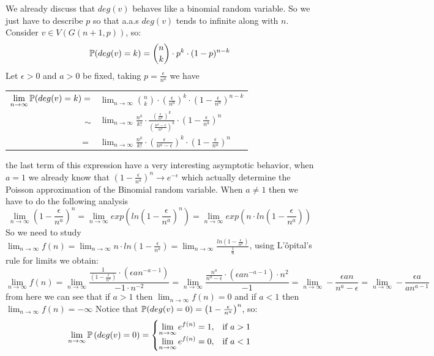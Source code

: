 We already discuss that $deg(v)$ behaves like a binomial random variable. So we just have to describe $p$ so that a.a.s $deg(v)$ tends to infinite along with $n$. Consider $v\in V(G(n+1,p))$, so:
$$ \P(deg(v)=k) = \binom{n}{k} \cdot p^{k} \cdot (1-p)^{n-k}$$
Let $\epsilon>0$ and $a>0$ be fixed, taking $p=\frac{\epsilon}{n^{a}}$ we have
\begin{center}
\begin{tabular}{ r l }
 $\displaystyle\lim_{n\to \infty } \P(deg(v)=k) =$ & $\displaystyle\lim_{n\to \infty} \binom{n}{k} \cdot \left( \frac{\epsilon}{n^a} \right)^k \cdot \left( 1-\frac{\epsilon}{n^a}\right)^{n-k}$ \\
 $\sim$ &  $\displaystyle\lim_{n\to \infty} \frac{n^k}{k!}\cdot  \frac{\left(\frac{\epsilon}{n^a}\right)^k} {\left(\frac{n^a - \epsilon}{n^a}\right)^k} \cdot \left(1-\frac{\epsilon}{n^a}\right)^{n} $\\
$=$ &  $\displaystyle\lim_{n\to \infty} \frac{n^k}{k!}\cdot \left(\frac{\epsilon} {n^a - \epsilon}\right)^k \cdot \left(1-\frac{\epsilon}{n^a}\right)^{n} $\\
\end{tabular}
\end{center}
the last term of this expression have a very interesting asymptotic behavior, when $a=1$ we already know that $\left(1-\frac{\epsilon}{n^a}\right)^{n} \to e^{-\epsilon}$ which actually determine the Poisson approximation of the Binomial random variable. When $a\neq 1$ then we have to do the following analysis
$$\displaystyle\lim_{n\to \infty } \left( 1 - \frac{\epsilon}{n^a}\right)^n = \displaystyle\lim_{n\to \infty} exp\left( ln \left( 1 - \frac{\epsilon}{n^a}\right)^n\right) = \displaystyle\lim_{n\to \infty} exp\left(n \cdot ln \left( 1 - \frac{\epsilon}{n^a}\right)\right)$$
So we need to study $\displaystyle\lim_{n\to \infty} f(n) = \displaystyle\lim_{n\to \infty} n \cdot ln \left( 1 - \frac{\epsilon}{n^a}\right)= \displaystyle\lim_{n\to \infty}\frac{ln \left( 1 - \frac{\epsilon}{n^a}\right)}{\frac{1}{n}}$, using L'ôpital's rule for limits we obtain:
$$\displaystyle\lim_{n\to \infty } f(n) = 
\displaystyle\lim_{n\to \infty } \frac{\frac{1}{\left( 1 - \frac{\epsilon}{n^a}\right)}\cdot (\epsilon a n^{-a-1})}
{-1\cdot n^{-2}} = 
\displaystyle\lim_{n\to \infty } \frac{\frac{n^a}{n^{a} - \epsilon}\cdot (\epsilon a n^{-a-1}) \cdot {n^{2}}}{-1} = 
\displaystyle\lim_{n\to \infty } - \frac{\epsilon a n}{n^{a} - \epsilon} =
\displaystyle\lim_{n\to \infty } - \frac{\epsilon a}{a n^{a-1}}
$$
from here we can see that if $a>1$ then $\displaystyle\lim_{n\to \infty } f(n) = 0$ and if $a<1$  then $\displaystyle\lim_{n\to \infty } f(n) = -\infty$
Notice that $\P(deg(v)=0) = \left(1 - \frac{\epsilon}{n^a} \right)^n$, so:
$$ \displaystyle\lim_{n\to \infty} \P\left(deg(v)=0\right) = \begin{cases} 
\displaystyle\lim_{n\to \infty}e^{f(n)} = 1, & \mbox{if } a>1 \\ 
\displaystyle\lim_{n\to \infty}e^{f(n)} = 0, & \mbox{if } a<1 \end{cases} $$

